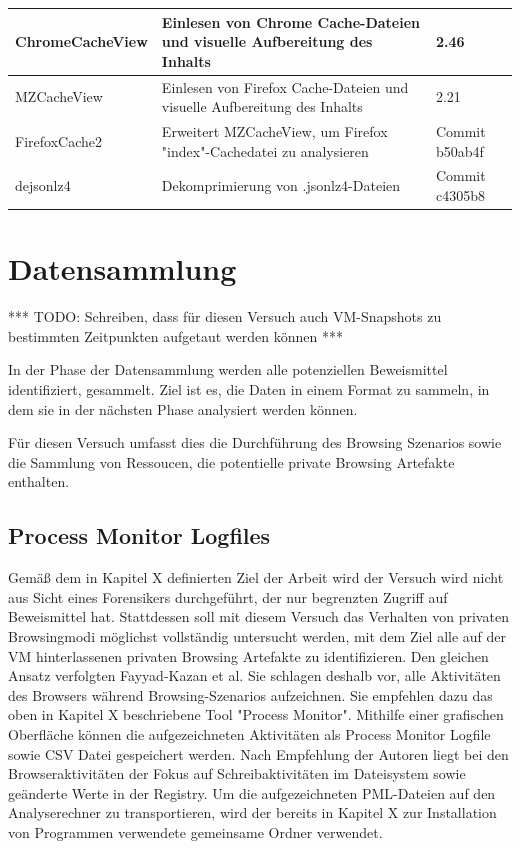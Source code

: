 \begin{table}[]
{\begin{tabular}{|l|l|l|}
ChromeCacheView                         & Einlesen von Chrome Cache-Dateien und visuelle Aufbereitung des Inhalts          & 2.46                                  \\ \hline
MZCacheView                             & Einlesen von Firefox Cache-Dateien und visuelle Aufbereitung des Inhalts         & 2.21                                  \\ \hline
FirefoxCache2                           & Erweitert MZCacheView, um Firefox "index"-Cachedatei zu analysieren              & Commit b50ab4f                        \\ \hline
dejsonlz4                               & Dekomprimierung von .jsonlz4-Dateien                                             & Commit c4305b8                        \\ \hline
\end{tabular}
}
\end{table}



\section{Datensammlung}

*** TODO: Schreiben, dass für diesen Versuch auch VM-Snapshots zu bestimmten Zeitpunkten aufgetaut werden können ***

In der Phase der Datensammlung werden alle potenziellen Beweismittel identifiziert, gesammelt. Ziel ist es, die Daten in einem Format zu sammeln, in dem sie in der nächsten Phase analysiert werden können. \cite{Izzati.2022}

Für diesen Versuch umfasst dies die Durchführung des Browsing Szenarios sowie die Sammlung von Ressoucen, die potentielle private Browsing Artefakte enthalten.

\subsection*{Process Monitor Logfiles}
Gemäß dem in Kapitel X definierten Ziel der Arbeit wird der Versuch wird nicht aus Sicht eines Forensikers durchgeführt, der nur begrenzten Zugriff auf Beweismittel hat. 
Stattdessen soll mit diesem Versuch das Verhalten von privaten Browsingmodi möglichst vollständig untersucht werden, mit dem Ziel alle auf der VM hinterlassenen privaten Browsing Artefakte zu identifizieren.
Den gleichen Ansatz verfolgten Fayyad-Kazan et al. \cite{Fayyad.2021} Sie schlagen deshalb vor, alle Aktivitäten des Browsers während Browsing-Szenarios aufzeichnen.
Sie empfehlen dazu das oben in Kapitel X beschriebene Tool "Process Monitor".
Mithilfe einer grafischen Oberfläche können die aufgezeichneten Aktivitäten als Process Monitor Logfile sowie CSV Datei gespeichert werden.
Nach Empfehlung der Autoren liegt bei den Browseraktivitäten der Fokus auf Schreibaktivitäten im Dateisystem sowie geänderte Werte in der Registry. \cite{Fayyad.2021, Rochmadi.2017}
Um die aufgezeichneten PML-Dateien auf den Analyserechner zu transportieren, wird der bereits in Kapitel X zur Installation von Programmen verwendete gemeinsame Ordner verwendet.

